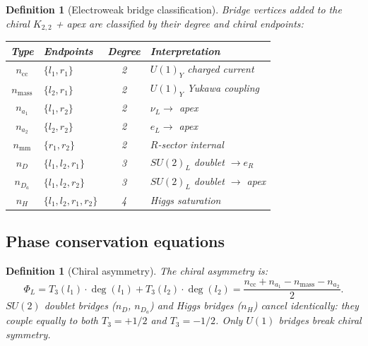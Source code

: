 \documentclass[11pt]{article}
\newtheorem{definition}[theorem]{Definition}
\begin{document}
\begin{definition}[Electroweak bridge classification]
\label{def:ew-bridges}
Bridge vertices added to the chiral $K_{2,2}$ + apex are
classified by their degree and chiral endpoints:
\begin{center}
\renewcommand{\arraystretch}{1.3}
\begin{tabular}{clcl}
\toprule
Type & Endpoints & Degree & Interpretation \\
\midrule
$n_{\mathrm{cc}}$ & $\{l_1, r_1\}$ & 2 &
  $U(1)_Y$ charged current \\
$n_{\mathrm{mass}}$ & $\{l_2, r_1\}$ & 2 &
  $U(1)_Y$ Yukawa coupling \\
$n_{a_1}$ & $\{l_1, r_2\}$ & 2 &
  $\nu_L \to$ apex \\
$n_{a_2}$ & $\{l_2, r_2\}$ & 2 &
  $e_L \to$ apex \\
$n_{\mathrm{mm}}$ & $\{r_1, r_2\}$ & 2 &
  $R$-sector internal \\
$n_D$ & $\{l_1, l_2, r_1\}$ & 3 &
  $SU(2)_L$ doublet $\to e_R$ \\
$n_{D_a}$ & $\{l_1, l_2, r_2\}$ & 3 &
  $SU(2)_L$ doublet $\to$ apex \\
$n_H$ & $\{l_1, l_2, r_1, r_2\}$ & 4 &
  Higgs saturation \\
\bottomrule
\end{tabular}
\end{center}
\end{definition}

\subsection{Phase conservation equations}

\begin{definition}[Chiral asymmetry]
\label{def:phi-l}
The \emph{chiral asymmetry} is:
\[
  \Phi_L = T_3(l_1) \cdot \deg(l_1) + T_3(l_2) \cdot \deg(l_2)
  = \frac{n_{\mathrm{cc}} + n_{a_1}
         - n_{\mathrm{mass}} - n_{a_2}}{2}.
\]
$SU(2)$ doublet bridges ($n_D$, $n_{D_a}$) and Higgs bridges
($n_H$) cancel identically: they couple equally to both
$T_3 = +1/2$ and $T_3 = -1/2$.  Only $U(1)$ bridges break
chiral symmetry.
\end{definition}
\end{document}
